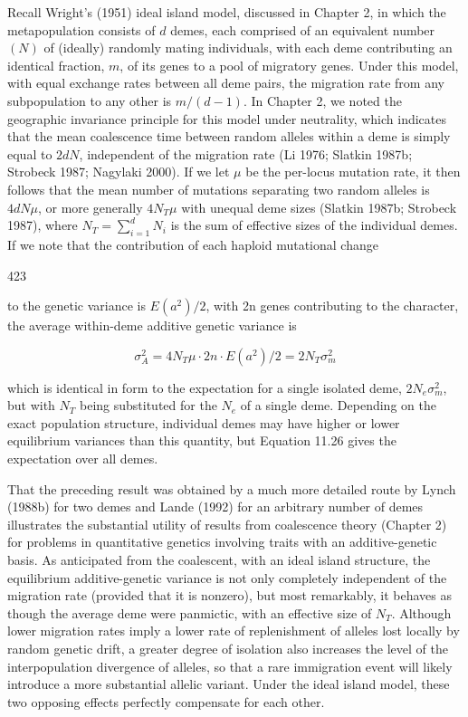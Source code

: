 \documentclass{article}
\begin{document}
Recall Wright's (1951) ideal island model, discussed in Chapter 2, in which the metapopulation consists of $d$ demes, each comprised of an equivalent number $(N)$ of (ideally) randomly mating individuals, with each deme contributing an identical fraction, $m$, of its genes to a pool of migratory genes. Under this model, with equal exchange rates between all deme pairs, the migration rate from any subpopulation to any other is $m/(d-1)$. In Chapter 2, we noted the geographic invariance principle for this model under neutrality, which indicates that the mean coalescence time between random alleles within a deme is simply equal to $2dN$, independent of the migration rate (Li 1976; Slatkin 1987b; Strobeck 1987; Nagylaki 2000). If we let $\mu$ be the per-locus mutation rate, it then follows that the mean number of mutations separating two random alleles is $4dN\mu$, or more generally $4N_{T}\mu$ with unequal deme sizes (Slatkin 1987b; Strobeck 1987), where $N_{T}=\sum_{i=1}^{d}N_{i}$ is the sum of effective sizes of the individual demes. If we note that the contribution of each haploid mutational change

423

to the genetic variance is  $ E(a^{2})/2 $, with 2n genes contributing to the character, the average within-deme additive genetic variance is

\begin{equation}
\sigma_{A}^{2}=4N_{T}\mu\cdot2n\cdot E(a^{2})/2=2N_{T}\sigma_{m}^{2}
\tag{11.26}
\label{eq:11_26}
\end{equation}

which is identical in form to the expectation for a single isolated deme,  $ 2N_e\sigma_m^2 $, but with  $ N_T $ being substituted for the  $ N_e $ of a single deme. Depending on the exact population structure, individual demes may have higher or lower equilibrium variances than this quantity, but Equation 11.26 gives the expectation over all demes.

That the preceding result was obtained by a much more detailed route by Lynch (1988b) for two demes and Lande (1992) for an arbitrary number of demes illustrates the substantial utility of results from coalescence theory (Chapter 2) for problems in quantitative genetics involving traits with an additive-genetic basis. As anticipated from the coalescent, with an ideal island structure, the equilibrium additive-genetic variance is not only completely independent of the migration rate (provided that it is nonzero), but most remarkably, it behaves as though the average deme were panmictic, with an effective size of  $ N_{T} $. Although lower migration rates imply a lower rate of replenishment of alleles lost locally by random genetic drift, a greater degree of isolation also increases the level of the interpopulation divergence of alleles, so that a rare immigration event will likely introduce a more substantial allelic variant. Under the ideal island model, these two opposing effects perfectly compensate for each other.
\end{document}
